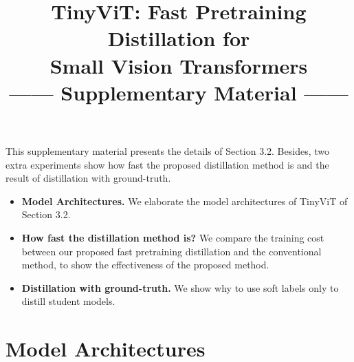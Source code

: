 \documentclass[runningheads]{llncs}
\begin{document}
\clearpage





\title{TinyViT: Fast Pretraining Distillation for \\  Small Vision Transformers \\ ------ Supplementary Material ------ }



\author{ }
\institute{ }

\maketitle

This supplementary material presents the details of Section 3.2. Besides, two extra experiments show how fast the proposed distillation method is and the result of distillation with ground-truth.

\begin{itemize}[noitemsep,topsep=0pt,parsep=0pt,partopsep=0pt]

\item \textbf{Model Architectures.} We elaborate the model architectures of TinyViT of Section 3.2.
\item \textbf{How fast the distillation method is?} We compare the training cost between our proposed fast pretraining distillation and the conventional method, to show the effectiveness of the proposed method.
\item \textbf{Distillation with ground-truth.} We show why to use soft labels only to distill student models.

\end{itemize}

\appendix
\section{Model Architectures}
\label{sec:model_arch}
\end{document}

